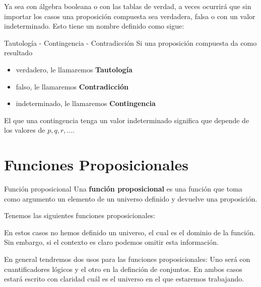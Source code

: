 \documentclass[12pt, twoside]{book}
\begin{document}
Ya sea con álgebra booleana o con las tablas de verdad, a veces ocurrirá que sin importar los casos una proposición compuesta sea verdadera, falsa o con un valor indeterminado. Esto tiene un nombre definido como sigue:
\begin{definition}{Tautología - Contingencia - Contradicción}
    Si una proposición compuesta da como resultado
        \begin{itemize}[label=\(\bullet\)]
                \item verdadero, le llamaremos \textbf{Tautología}
                \item falso, le llamaremos \textbf{Contradicción}
                \item indeterminado, le llamaremos \textbf{Contingencia}
        \end{itemize}
\end{definition}
\begin{note}
    El que una contingencia tenga un valor indeterminado significa que depende de los valores de \(p,q,r,\ldots\).
\end{note}

\section{Funciones Proposicionales}
\begin{definition}{Función proposicional}
    Una \textbf{función proposicional} es una función que toma como argumento un elemento de un universo definido y devuelve una proposición.
\end{definition}
\begin{example}
    Tenemos las siguientes funciones proposicionales:
\end{example}
En estos casos no hemos definido un universo, el cual es el dominio de la función. Sin embargo, si el contexto es claro podemos omitir esta información. 
\begin{observation}
    En general tendremos dos usos para las funciones proposicionales: Uno será con cuantificadores lógicos y el otro en la definción de conjuntos. En ambos casos estará escrito con claridad cuál es el universo en el que estaremos trabajando.
\end{observation}
\end{document}
